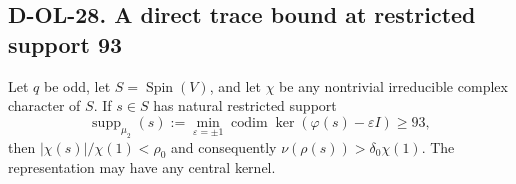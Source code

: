 \subsection*{D-OL-28. A direct trace bound at restricted support 93}

\begin{theorem}[D-OL-28]
Let $q$ be odd, let $S=\operatorname{Spin}(V)$, and let
$\chi$ be any nontrivial irreducible complex character of $S$.
If $s\in S$ has natural restricted support
\[
 \operatorname{supp}_{\mu_2}(s)
      :=\min_{\varepsilon=\pm1}
             \operatorname{codim}\ker(\varphi(s)-\varepsilon I)
      \ge93,
 \tag{SPO.8}
\]
then $|\chi(s)|/\chi(1)<\rho_0$ and consequently
$\nu(\rho(s))>\delta_0\chi(1)$.
The representation may have any central kernel.
\end{theorem}

